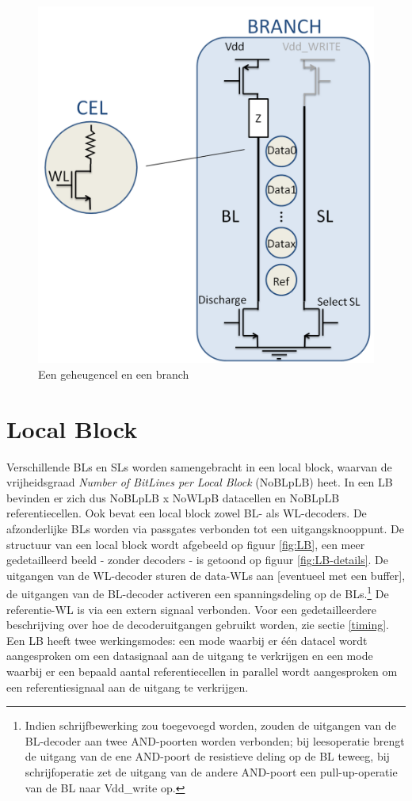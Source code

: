 \begin{figure}
  \centering
  \includegraphics[scale=0.3]{../fig/hfdstk-architecture-cell-branch.png}
  \caption[Een geheugencel en een branch]{Een geheugencel en een branch}
  \label{fig:cellbranch}
\end{figure}

\section{Local Block}
Verschillende BLs en SLs worden samengebracht in een local block, waarvan de vrijheidsgraad \emph{Number of BitLines per Local Block} (NoBLpLB) heet. In een LB bevinden er zich dus NoBLpLB x NoWLpB datacellen en NoBLpLB referentiecellen. Ook bevat een local block zowel BL- als WL-decoders. De afzonderlijke BLs worden via passgates verbonden tot een uitgangsknooppunt.
De structuur van een local block wordt afgebeeld op figuur \ref{fig:LB}, een meer gedetailleerd beeld - zonder decoders - is getoond op figuur \ref{fig:LB-details}.
De uitgangen van de WL-decoder sturen de data-WLs aan [eventueel met een buffer], de uitgangen van de BL-decoder activeren een spanningsdeling op de BLs.\footnote{Indien schrijfbewerking zou toegevoegd worden, zouden de uitgangen van de BL-decoder aan twee AND-poorten worden verbonden; bij leesoperatie brengt de uitgang van de ene AND-poort de resistieve deling op de BL teweeg, bij schrijfoperatie zet de uitgang van de andere AND-poort een pull-up-operatie van de BL naar Vdd\_write op.} De referentie-WL is via een extern signaal verbonden. Voor een gedetailleerdere beschrijving over hoe de decoderuitgangen gebruikt worden, zie sectie \ref{timing}.
Een LB heeft twee werkingsmodes: een mode waarbij er één datacel wordt aangesproken om een datasignaal aan de uitgang te verkrijgen en een mode waarbij er een bepaald aantal referentiecellen in parallel wordt aangesproken om een referentiesignaal aan de uitgang te verkrijgen.

